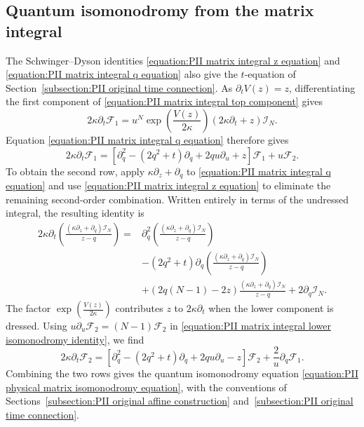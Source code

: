 \documentclass[a4paper,11pt]{article}
\newcommand{\cF}{\mathcal{F}}
\numberwithin{equation}{section}
\begin{document}
\subsection{Quantum isomonodromy from the matrix integral}
The Schwinger--Dyson identities
\eqref{equation:PII matrix integral z equation} and
\eqref{equation:PII matrix integral q equation} also give the
$t$-equation of Section~\ref{subsection:PII original time connection}.  As $\partial_{t}V(z)=z$, differentiating the first
component of \eqref{equation:PII matrix integral top component} gives
\begin{equation}
	2\kappa\partial_{t}\cF_{1}
	=
	u^{N}\exp\left(\frac{V(z)}{2\kappa}\right)
	\left(2\kappa\partial_{t}+z\right)\mathcal{I}_{N}.
\end{equation}
Equation \eqref{equation:PII matrix integral q equation} therefore gives
\begin{equation}
2\kappa\partial_{t}\cF_{1}
	=
	\left[
	\partial_{q}^{2}-(2q^{2}+t)\partial_{q}
	+2qu\partial_{u}+z
	\right]\cF_{1}
	+u\cF_{2}.
\end{equation}
To obtain the second row, apply $\kappa\partial_{z}+\partial_{q}$ to
\eqref{equation:PII matrix integral q equation} and use
\eqref{equation:PII matrix integral z equation} to eliminate the
remaining second-order combination.  Written entirely in terms of
the undressed integral, the resulting identity is
\begin{equation}
	\label{equation:PII matrix integral lower isomonodromy identity}
	\begin{aligned}
		2\kappa\partial_{t}
		\left(\frac{(\kappa\partial_{z}+\partial_{q})\mathcal{I}_{N}}{z-q}\right)
		={}&\partial_{q}^{2}
		\left(\frac{(\kappa\partial_{z}+\partial_{q})\mathcal{I}_{N}}{z-q}\right)
		\\
		&-(2q^{2}+t)\partial_{q}
		\left(\frac{(\kappa\partial_{z}+\partial_{q})\mathcal{I}_{N}}{z-q}\right)
		\\
		&+(2q(N-1)-2z)
		\frac{(\kappa\partial_{z}+\partial_{q})\mathcal{I}_{N}}{z-q}
		+2\partial_{q}\mathcal{I}_{N}.
	\end{aligned}
\end{equation}
The factor $\exp\left(\frac{V(z)}{2\kappa}\right)$ contributes $z$
to $2\kappa\partial_{t}$ when the lower component is dressed.
Using $u\partial_{u}\cF_{2}=(N-1)\cF_{2}$ in
\eqref{equation:PII matrix integral lower isomonodromy identity}, we find
\begin{equation}
2\kappa\partial_{t}\cF_{2}
	=
	\left[
	\partial_{q}^{2}-(2q^{2}+t)\partial_{q}
	+2qu\partial_{u}-z
	\right]\cF_{2}
	+\frac{2}{u}\partial_{q}\cF_{1}.
\end{equation}
Combining the two rows gives the quantum isomonodromy equation
\eqref{equation:PII physical matrix isomonodromy equation}, with
the conventions of
Sections~\ref{subsection:PII original affine construction}
and~\ref{subsection:PII original time connection}.
\end{document}
